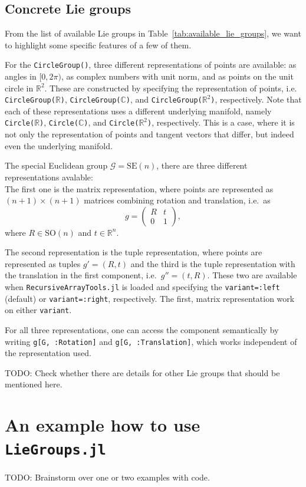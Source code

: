 \documentclass{juliacon}
\begin{document}
\subsection{Concrete Lie groups}\label{subsec:ConcreteLieGroups}

From the list of available Lie groups in Table~\ref{tab:available_lie_groups}, we want to highlight some specific features of a few of them.

For the \verb|CircleGroup()|, three different representations of points are available: as angles in \([0, 2\pi)\), as complex numbers with unit norm, and as points on the unit circle in \(\mathbb{R}^2\).
These are constructed by specifying the representation of points, i.e. \verb|CircleGroup(|$\mathbb R$\verb|)|, \verb|CircleGroup(|$\mathbb C$\verb|)|, and \verb|CircleGroup(|$\mathbb R^2$\verb|)|, respectively. Note that each of these representations uses a different underlying manifold, namely \verb|Circle(|$\mathbb R$\verb|)|, \verb|Circle(|$\mathbb C$\verb|)|, and \verb|Circle(|$\mathbb R^2$\verb|)|, respectively.
This is a case, where it is not only the representation of points and tangent vectors that differ, but indeed even the underlying manifold.

The special Euclidean group \(\mathcal G = \mathrm{SE}(n)\), there are three different representations avalable:
\\
The first one is the matrix representation, where points are represented as \((n+1) \times (n+1)\) matrices combining rotation and translation, i.e.\ as
\begin{equation*}
    g = \begin{pmatrix} R & t \\
    0 & 1 \end{pmatrix},
\end{equation*}
where \(R \in \mathrm{SO}(n)\) and \(t \in \mathbb{R}^n\).

The second representation is the tuple representation, where points are represented as tuples \(g' = (R, t)\) and the third is the tuple representation with the translation in the first component, i.e.\ \(g'' = (t, R)\). These two are available when \verb|RecursiveArrayTools.jl| is loaded and specifying the \verb|variant=:left| (default) or \verb|variant=:right|, respectively.
The first, matrix representation work on either \verb|variant|.

For all three representations, one can access the component semantically by writing \verb|g[G, :Rotation]| and \verb|g[G, :Translation]|, which works independent of the representation used.

{\color{red}TODO: Check whether there are details for other Lie groups that should be mentioned here.}

\section{An example how to use {\texttt{LieGroups.jl}}}%
\label{sec:Example}

{\color{red}TODO: Brainstorm over one or two examples with code.}


\end{document}
